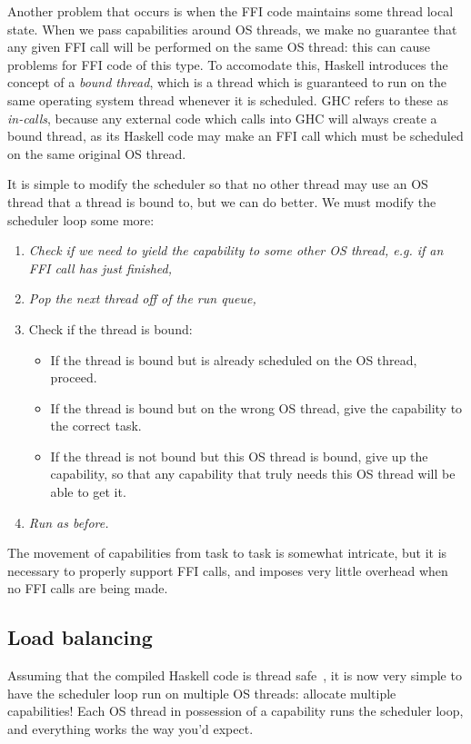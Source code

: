 Another problem that occurs is when the FFI code maintains some thread
local state.  When we pass capabilities around OS threads, we make no
guarantee that any given FFI call will be performed on the same OS
thread: this can cause problems for FFI code of this type.  To
accomodate this, Haskell introduces the concept of a \emph{bound
thread}, which is a thread which is guaranteed to run on the same
operating system thread whenever it is scheduled.  GHC refers to these
as \emph{in-calls}, because any external code which calls into GHC will
always create a bound thread, as its Haskell code may make an FFI call
which must be scheduled on the same original OS thread.

It is simple to modify the scheduler so that no other thread may use
an OS thread that a thread is bound to, but we can do better.  We must modify
the scheduler loop some more:

\begin{enumerate}
    \item \emph{Check if we need to yield the capability to some other OS thread, e.g. if an FFI call has just finished,}
    \item \emph{Pop the next thread off of the run queue,}
    \item Check if the thread is bound:
        \begin{itemize}
            \item If the thread is bound but is already scheduled on the OS thread, proceed.
            \item If the thread is bound but on the wrong OS thread, give the capability to the correct task.
            \item If the thread is not bound but this OS thread is bound, give up the capability, so that any capability that truly needs this OS thread will be able to get it.
        \end{itemize}
    \item \emph{Run as before.}
\end{enumerate}

The movement of capabilities from task to task is somewhat intricate,
but it is necessary to properly support FFI calls, and imposes very
little overhead when no FFI calls are being made.

\subsection{Load balancing}

Assuming that the compiled Haskell code is thread safe~\XXX, it is now
very simple to have the scheduler loop run on multiple OS threads:
allocate multiple capabilities!  Each OS thread in possession of a capability
runs the scheduler loop, and everything works the way you'd expect.

